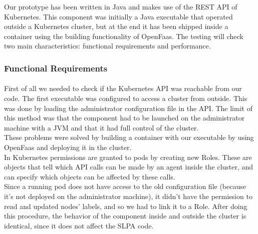 Our prototype has been written in Java and makes use of the REST API of Kubernetes. 
This component was initially a Java executable that operated outside a Kubernetes cluster,
but at the end it has been shipped inside a container using the building functionality of OpenFaas.
The testing will check two main characteristics: functional requirements and performance.  
\\
\subsubsection*{Functional Requirements}
\paragraph{}
First of all we needed to check if the Kubernetes API was reachable from our code.
The first executable was configured to access a cluster from outside. This was done by loading
the administrator configuration file in the API.
The limit of this method was that the component had to be launched on the administrator machine with a JVM
and that it had full control of the cluster. 
\\
These problems were solved by building a container with our executable by using OpenFaas and deploying it
in the cluster.
\\
In Kubernetes permissions are granted to pods by creating new Roles. These are objects that tell which API 
calls can be made by an agent inside the cluster, and can specify which objects can be affected by these calls.
\\
Since a running pod does not have access to the old configuration file (because it's not deployed on the administrator machine),
it didn't have the permission to read and updated nodes' labels, and so we had to link it to a Role.
After doing this procedure, the behavior of the component inside and outside the cluster is identical,
since it does not affect the SLPA code.
